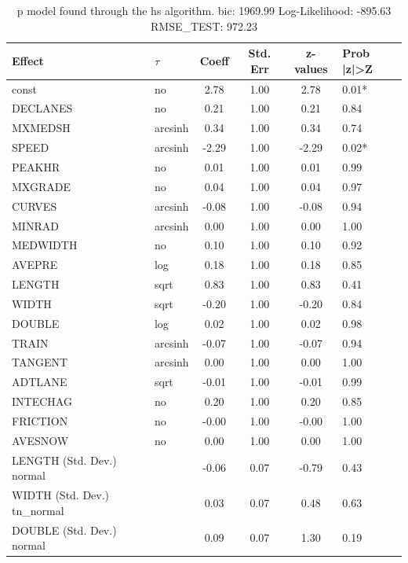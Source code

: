 \begin{table}
	\caption{p model found through the hs algorithm. bic: 1969.99 Log-Likelihood: -895.63 RMSE_TEST: 972.23}
	\begin{center}
		\begin{tabular}{|l|l|c|c|c|l|}
			\hline
			Effect & $\tau$ & Coeff & Std. Err & z-values & Prob |z|>Z \\
			\hline
			const & no & 2.78 & 1.00 & 2.78 & 0.01* \\
			\hline
			DECLANES & no & 0.21 & 1.00 & 0.21 & 0.84 \\
			\hline
			MXMEDSH & arcsinh & 0.34 & 1.00 & 0.34 & 0.74 \\
			\hline
			SPEED & arcsinh & -2.29 & 1.00 & -2.29 & 0.02* \\
			\hline
			PEAKHR & no & 0.01 & 1.00 & 0.01 & 0.99 \\
			\hline
			MXGRADE & no & 0.04 & 1.00 & 0.04 & 0.97 \\
			\hline
			CURVES & arcsinh & -0.08 & 1.00 & -0.08 & 0.94 \\
			\hline
			MINRAD & arcsinh & 0.00 & 1.00 & 0.00 & 1.00 \\
			\hline
			MEDWIDTH & no & 0.10 & 1.00 & 0.10 & 0.92 \\
			\hline
			AVEPRE & log & 0.18 & 1.00 & 0.18 & 0.85 \\
			\hline
			LENGTH & sqrt & 0.83 & 1.00 & 0.83 & 0.41 \\
			\hline
			WIDTH & sqrt & -0.20 & 1.00 & -0.20 & 0.84 \\
			\hline
			DOUBLE & log & 0.02 & 1.00 & 0.02 & 0.98 \\
			\hline
			TRAIN & arcsinh & -0.07 & 1.00 & -0.07 & 0.94 \\
			\hline
			TANGENT & arcsinh & 0.00 & 1.00 & 0.00 & 1.00 \\
			\hline
			ADTLANE & sqrt & -0.01 & 1.00 & -0.01 & 0.99 \\
			\hline
			INTECHAG & no & 0.20 & 1.00 & 0.20 & 0.85 \\
			\hline
			FRICTION & no & -0.00 & 1.00 & -0.00 & 1.00 \\
			\hline
			AVESNOW & no & 0.00 & 1.00 & 0.00 & 1.00 \\
			\hline
			LENGTH (Std. Dev.) normal &  & -0.06 & 0.07 & -0.79 & 0.43 \\
			\hline
			WIDTH (Std. Dev.) tn_normal &  & 0.03 & 0.07 & 0.48 & 0.63 \\
			\hline
			DOUBLE (Std. Dev.) normal &  & 0.09 & 0.07 & 1.30 & 0.19 \\

\end{tabular}
\end{center}
\end{table}
